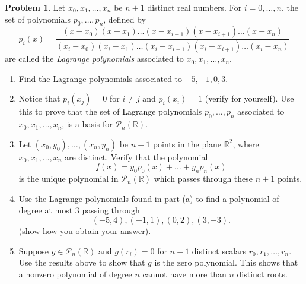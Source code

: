 \documentclass[10pt]{article}
\theoremstyle{definition}
\newtheorem{problem}{Problem}
\begin{document}
\begin{problem}
Let $x_0,x_1,\dots,x_n$ be $n+1$ distinct real numbers. For $i=0,\dots,n$, the set of polynomials $p_0,\dots,p_n$, defined by
$$p_i(x)=\frac{(x-x_0)(x-x_1)\dots(x-x_{i-1})(x-x_{i+1})\dots(x-x_n)}{(x_i-x_0)(x_i-x_1)\dots(x_i-x_{i-1})(x_i-x_{i+1})\dots(x_i-x_n)}$$
are called the \textit{Lagrange polynomials} associated to $x_0,x_1,\dots,x_n$.
\begin{enumerate}[label=(\alph*)]
  \item Find the Lagrange polynomials associated to $-5,-1,0,3$.
  \item Notice that $p_i(x_j)=0$ for $i\neq j$ and $p_i(x_i)=1$ (verify for yourself). Use this to prove that the set of Lagrange polynomials
        $p_0,\dots,p_n$ associated to $x_0,x_1,\dots,x_n$, is a basis for $\mathcal{P}_n(\mathbb{R})$.
  \item Let $(x_0, y_0),\dots,(x_n, y_n)$ be $n+1$ points in the plane $\mathbb{R}^2$, where $x_0,x_1,\dots,x_n$ are distinct.
        Verify that the polynomial $$f(x)=y_0p_0(x)+\dots+y_np_n(x)$$ is the unique polynomial in  $\mathcal{P}_n(\mathbb{R})$
        which passes through these $n+1$ points.
  \item Use the Lagrange polynomials found in part (a) to find a polynomial of degree at most 3 passing through
        $$(-5, 4), (-1, 1), (0, 2), (3, -3).$$
        (show how you obtain your answer).
  \item Suppose $g\in \mathcal{P}_n(\mathbb{R})$ and $g(r_i) = 0$ for $n + 1$ distinct scalars $r_0,r_1,\dots,r_n$.
        Use the results above to show that $g$ is the zero polynomial. This shows that a nonzero polynomial of degree $n$ cannot have more than $n$ distinct roots.
\end{enumerate}
\end{problem}
\end{document}
